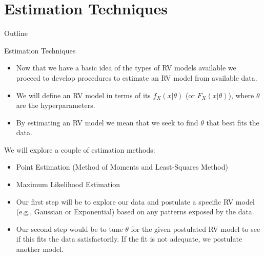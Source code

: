 \documentclass[9pt]{beamer}
\begin{document}
\section{Estimation Techniques}
\begin{frame}{Outline}
\tableofcontents[currentsection]
\end{frame}

%
\begin{frame}{Estimation Techniques}


\begin{itemize}
\item Now that we have a basic idea of the types of RV models available we proceed to develop procedures to estimate an RV model from available data. 

\item We will  define an RV model in terms of its $f_X(x|\theta)$ (or $F_X(x|\theta)$), where $\theta$ are the hyperparameters. 

\item By estimating an RV model we mean that we seek to find $\theta$ that best fits the data.

\end{itemize}

\begin{block}{}
We will explore a couple of estimation methods:
\begin{itemize}
\item Point Estimation (Method of Moments and Least-Squares Method)

\item Maximum Likelihood Estimation
\end{itemize}
\end{block}

\begin{itemize}
\item Our first step will be to explore our data and postulate a specific RV model (e.g., Gaussian or Exponential) based on any patterns exposed by the data. 
\item Our second step would be to tune $\theta$ for the given postulated RV model to see if this fits the data satisfactorily. If the fit is not adequate, we postulate another model.
\end{itemize}

\end{frame}
\end{document}
